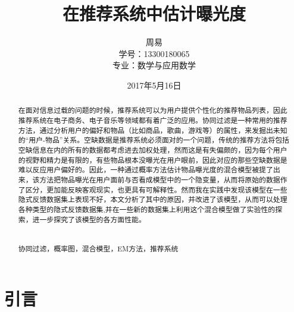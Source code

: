 \documentclass[notitlepage,cs4size,punct,oneside]{ctexrep}
\title{{\zihao{1}\heiti{} 在推荐系统中估计曝光度}}
\author{周易\\学号：13300180065\\专业：数学与应用数学}
\date{2017年5月16日}
\numberwithin{equation}{chapter}
\theoremstyle{mystyle}
\begin{document}
\CTEXoptions[abstractname={摘要：}]
\CTEXoptions[bibname={\heiti 参考文献}]

\renewcommand{\thepage}{\roman{page}}
\setcounter{page}{1}
\tableofcontents\clearpage

\maketitle\renewcommand{\thepage}{\arabic{page}}
\thispagestyle{empty}\setcounter{page}{0}
\begin{abstract}
在面对信息过载的问题的时候，推荐系统可以为用户提供个性化的推荐物品列表，因此推荐系统在电子商务、电子音乐等领域都有着广泛的应用。协同过滤是一种常用的推荐方法，通过分析用户的偏好和物品（比如商品，歌曲，游戏等）的属性，来发掘出未知的“用户-物品”关系。空缺数据是推荐系统必须面对的一个问题，传统的推荐方法\cite{WMF}将包括空缺信息在内的所有的数据都考虑进去加权处理，然而这是有失偏颇的，因为每个用户的视野和精力是有限的，有些物品根本没曝光在用户眼前，因此对应的那些空缺数据是难以反应用户偏好的。因此，一种通过概率方法估计物品曝光度的混合模型\cite{EXPOMF}被提了出来，该方法把物品曝光在用户面前与否看成模型中的一个隐变量，从而将原始的数据作了区分，更加能反映客观现实，也更具有可解释性。然而我在实践中发现该模型在一些隐式反馈数据集上表现不好，本文分析了其中的原因，并改进了该模型，从而可以处理各种类型的隐式反馈数据集,并在一些新的数据集上利用这个混合模型做了实验性的探索，进一步探究了该模型的各方面性能。
\\
\\
\\
 协同过滤，概率图，混合模型，EM方法，推荐系统
\end{abstract}


\chapter{引言}
\end{document}
